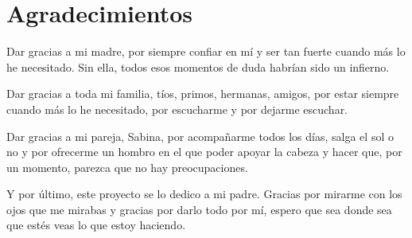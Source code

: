 \newpage
\chapter*{Agradecimientos}

Dar gracias a mi madre, por siempre confiar en mí y ser tan fuerte cuando más lo he necesitado. Sin ella, todos esos momentos de duda habrían sido un infierno.

Dar gracias a toda mi familia, tíos, primos, hermanas, amigos, por estar siempre cuando más lo he necesitado, por escucharme y por dejarme escuchar.

Dar gracias a mi pareja, Sabina, por acompañarme todos los días, salga el sol o no y por ofrecerme un hombro en el que poder apoyar la cabeza y hacer que, por un momento, parezca que no hay preocupaciones.

Y por último, este proyecto se lo dedico a mi padre. Gracias por mirarme con los ojos que me mirabas y gracias por darlo todo por mí, espero que sea donde sea que estés veas lo que estoy haciendo.
